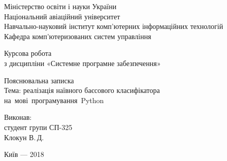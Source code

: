 \documentclass[
	a4paper,
	oneside,
	DIV = 12,
	fontsize = 13pt,
	headings = normal,
	numbers = endperiod,
	bibliography = totoc, %
]{scrartcl}
\theoremstyle{mythm}
\begin{document}
\begin{titlepage}
		\begin{center}
			Міністерство освіти і науки України\\
			Національний авіаційний університет\\
			Навчально-науковий інститут комп'ютерних інформаційних технологій\\
			Кафедра комп'ютеризованих систем управління

			\vspace{\fill}
				Курсова робота\\
				з дисципліни «Системне програмне забезпечення»\\

				\vspace*{3\baselineskip}

				Пояснювальна записка\\
				Тема: реалізація наївного баєсового класифікатора на~мові~програмування~\textenglish{Python}

			\vspace{\fill}

			\begin{flushright}
				Виконав:\\
				студент групи СП-325\\
				Клокун В.\,Д.\\
			\end{flushright}

			Київ — 2018
		\end{center}
	\end{titlepage}
\end{document}
